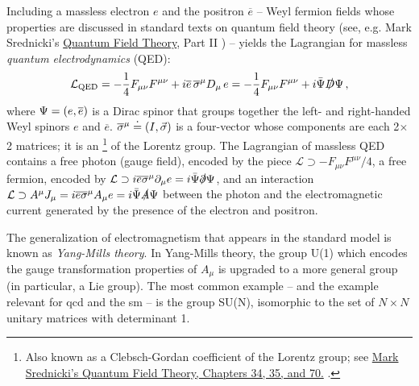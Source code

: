 Including a massless electron \(e\) and the positron \(\overline{e}\) -- Weyl fermion fields whose properties are discussed in standard texts on quantum field theory (see, e.g. Mark Srednicki's \underline{Quantum Field Theory}, Part II \cite{}) -- yields the Lagrangian for massless \textit{quantum electrodynamics} (QED):
\begin{align}
    \mathcal{L}_\text{QED}
    =
    -\frac{1}{4}F_{\mu\nu} F^{\mu\nu}
    +
    i \overline{e} \, \overline{\sigma}^\mu D_\mu \, e
    =
    -\frac{1}{4}F_{\mu\nu} F^{\mu\nu}
    +
    i \bar{\Psi} \slashed{D} \Psi
    \,,
\end{align}
where \(\Psi = \left(e, \overline{e}\right)\) is a Dirac spinor that groups together the left- and right-handed Weyl spinors \(e\) and \(\overline{e}\).
%
\(\overline{\sigma}^\mu \overset{\boldsymbol{\cdot}}{=} \left(I, \vec{\sigma}\right)\) is a four-vector whose components are each 2\(\times\)2 matrices;
%
it is an %
\footnote{
    Also known as a Clebsch-Gordan coefficient of the Lorentz group;
    see \href{https://web.physics.ucsb.edu/~mark/ms-qft-DRAFT.pdf\#page=415}{Mark Srednicki's \underline{Quantum Field Theory}, Chapters 34, 35, and 70.} \cite{}.
}
%
of the Lorentz group.
%
The Lagrangian of massless QED contains a free photon (gauge field), encoded by the piece \(\mathcal{L} \supset -F_{\mu\nu}F^{\mu\nu}/4\), a free fermion, encoded by \(\mathcal{L} \supset i\overline{e} \overline{\sigma}^\mu \partial_\mu e = i \bar{\Psi} \slashed{\partial} \Psi\), and an interaction \(\mathcal{L} \supset A^\mu J_\mu = i\overline{e} \overline{\sigma}^\mu A_\mu e = i \bar{\Psi} \slashed{A} \Psi\) between the photon and the electromagnetic current generated by the presence of the electron and positron.


The generalization of electromagnetism that appears in the standard model is known as \textit{Yang-Mills theory}.
%
In Yang-Mills theory, the group U(1) which encodes the gauge transformation properties of \(A_\mu\) is upgraded to a more general group (in particular, a Lie group).
%
The most common example -- and the example relevant for \gls{qcd} and the \gls{sm} -- is the group SU(N), isomorphic to the set of \(N\times N\) unitary matrices with determinant 1.




